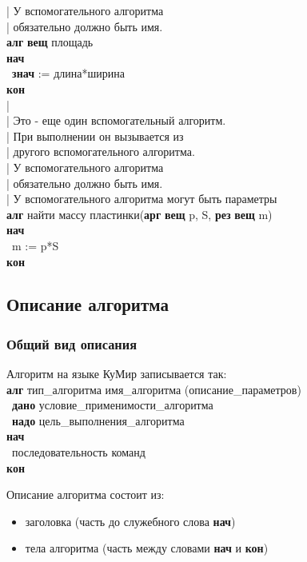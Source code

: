 \documentclass[12pt,a4paper]{article}
\newcommand{\otstup}{\textperiodcentered\ }
\begin{document}
{| У вспомогательного алгоритма \\
|   обязательно должно быть имя.\\
\textbf{алг} \textbf{вещ} площадь\\
\textbf{нач}\\
\otstup \textbf{знач} := длина*ширина\\
\textbf{кон}\\
|\\
| Это - еще один вспомогательный алгоритм.\\
| При выполнении он вызывается из \\
|    другого вспомогательного алгоритма.\\
| У вспомогательного алгоритма \\
|   обязательно должно быть имя.\\
| У вспомогательного алгоритма могут быть параметры \\
\textbf{алг} найти массу пластинки(\textbf{арг} \textbf{вещ} p, S, \textbf{рез} \textbf{вещ} m) \\
\textbf{нач}\\
\otstup m := p*S\\
\textbf{кон}
}\normalsize

\subsection{Описание алгоритма}
\label{algorithm}

\subsubsection{Общий вид описания}

Алгоритм на языке КуМир записывается так:
{\sffamily~\\
\textbf{алг} тип\_алгоритма имя\_алгоритма (описание\_параметров)\\
\otstup \textbf{дано} условие\_применимости\_алгоритма\\
\otstup \textbf{надо} цель\_выполнения\_алгоритма\\
\textbf{нач}\\
\otstup последовательность команд\\
\textbf{кон}\\
}
	
	Описание алгоритма состоит из:
\begin{itemize}
\item заголовка (часть до служебного слова \textbf{нач})
\item тела алгоритма (часть между словами \textbf{нач} и \textbf{кон})
\end{itemize}
\end{document}
